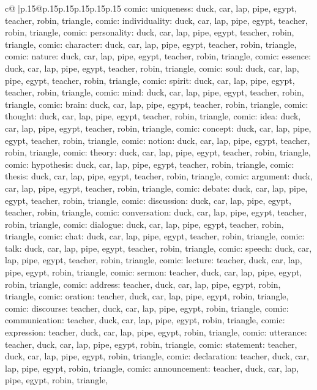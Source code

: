 \documentclass{article}
\begin{document}
{\begin{supertabular}{c@{$\;$}|p{.15\linewidth}@{}p{.15\linewidth}p{.15\linewidth}p{.15\linewidth}p{.15\linewidth}p{.15\linewidth}}
{{{comic\n\nCLUE: uniqueness\nTARGETS: duck, car, lap, pipe, egypt, teacher, robin, triangle, comic\n\nCLUE: individuality\nTARGETS: duck, car, lap, pipe, egypt, teacher, robin, triangle, comic\n\nCLUE: personality\nTARGETS: duck, car, lap, pipe, egypt, teacher, robin, triangle, comic\n\nCLUE: character\nTARGETS: duck, car, lap, pipe, egypt, teacher, robin, triangle, comic\n\nCLUE: nature\nTARGETS: duck, car, lap, pipe, egypt, teacher, robin, triangle, comic\n\nCLUE: essence\nTARGETS: duck, car, lap, pipe, egypt, teacher, robin, triangle, comic\n\nCLUE: soul\nTARGETS: duck, car, lap, pipe, egypt, teacher, robin, triangle, comic\n\nCLUE: spirit\nTARGETS: duck, car, lap, pipe, egypt, teacher, robin, triangle, comic\n\nCLUE: mind\nTARGETS: duck, car, lap, pipe, egypt, teacher, robin, triangle, comic\n\nCLUE: brain\nTARGETS: duck, car, lap, pipe, egypt, teacher, robin, triangle, comic\n\nCLUE: thought\nTARGETS: duck, car, lap, pipe, egypt, teacher, robin, triangle, comic\n\nCLUE: idea\nTARGETS: duck, car, lap, pipe, egypt, teacher, robin, triangle, comic\n\nCLUE: concept\nTARGETS: duck, car, lap, pipe, egypt, teacher, robin, triangle, comic\n\nCLUE: notion\nTARGETS: duck, car, lap, pipe, egypt, teacher, robin, triangle, comic\n\nCLUE: theory\nTARGETS: duck, car, lap, pipe, egypt, teacher, robin, triangle, comic\n\nCLUE: hypothesis\nTARGETS: duck, car, lap, pipe, egypt, teacher, robin, triangle, comic\n\nCLUE: thesis\nTARGETS: duck, car, lap, pipe, egypt, teacher, robin, triangle, comic\n\nCLUE: argument\nTARGETS: duck, car, lap, pipe, egypt, teacher, robin, triangle, comic\n\nCLUE: debate\nTARGETS: duck, car, lap, pipe, egypt, teacher, robin, triangle, comic\n\nCLUE: discussion\nTARGETS: duck, car, lap, pipe, egypt, teacher, robin, triangle, comic\n\nCLUE: conversation\nTARGETS: duck, car, lap, pipe, egypt, teacher, robin, triangle, comic\n\nCLUE: dialogue\nTARGETS: duck, car, lap, pipe, egypt, teacher, robin, triangle, comic\n\nCLUE: chat\nTARGETS: duck, car, lap, pipe, egypt, teacher, robin, triangle, comic\n\nCLUE: talk\nTARGETS: duck, car, lap, pipe, egypt, teacher, robin, triangle, comic\n\nCLUE: speech\nTARGETS: duck, car, lap, pipe, egypt, teacher, robin, triangle, comic\n\nCLUE: lecture\nTARGETS: teacher, duck, car, lap, pipe, egypt, robin, triangle, comic\n\nCLUE: sermon\nTARGETS: teacher, duck, car, lap, pipe, egypt, robin, triangle, comic\n\nCLUE: address\nTARGETS: teacher, duck, car, lap, pipe, egypt, robin, triangle, comic\n\nCLUE: oration\nTARGETS: teacher, duck, car, lap, pipe, egypt, robin, triangle, comic\n\nCLUE: discourse\nTARGETS: teacher, duck, car, lap, pipe, egypt, robin, triangle, comic\n\nCLUE: communication\nTARGETS: teacher, duck, car, lap, pipe, egypt, robin, triangle, comic\n\nCLUE: expression\nTARGETS: teacher, duck, car, lap, pipe, egypt, robin, triangle, comic\n\nCLUE: utterance\nTARGETS: teacher, duck, car, lap, pipe, egypt, robin, triangle, comic\n\nCLUE: statement\nTARGETS: teacher, duck, car, lap, pipe, egypt, robin, triangle, comic\n\nCLUE: declaration\nTARGETS: teacher, duck, car, lap, pipe, egypt, robin, triangle, comic\n\nCLUE: announcement\nTARGETS: teacher, duck, car, lap, pipe, egypt, robin, triangle, }}}
\end{supertabular}}
\end{document}
